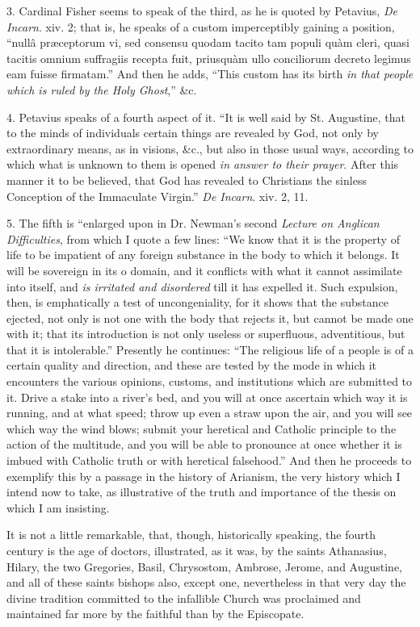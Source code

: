 3. Cardinal Fisher seems to speak of the third, as
he is quoted by Petavius, \emph{De Incarn}. xiv. 2; that is, he speaks
of a custom imperceptibly gaining a position, ``nullâ præceptorum vi,
sed consensu quodam tacito tam populi quàm cleri, quasi tacitis omnium
suffragiis recepta fuit, priusquàm ullo conciliorum decreto legimus eam
fuisse firmatam.'' And then he adds, ``This custom has its birth \emph{in
that people which is ruled by the Holy Ghost},'' \&c.

4. Petavius speaks of a fourth aspect of it. ``It is
well said by St. Augustine, that to the minds of individuals certain
things are revealed by God, not only by extraordinary means, as in
visions, \&c., but also in those usual ways, according to which what
is unknown to them is opened \emph{in answer to their prayer}. After
this manner it to be believed, that God has revealed to Christians the
sinless Conception of the Immaculate Virgin.'' \emph{De Incarn}. xiv. 2,
11.

5. The fifth is ``enlarged upon in Dr. Newman's
second \emph{Lecture on Anglican Difficulties}, from which I quote a few
lines: ``We know that it is the property of life to be impatient of any
foreign substance in the body to which it belongs. It will be sovereign
in its o domain, and it conflicts with what it cannot assimilate into
itself, and \emph{is irritated and disordered} till it has expelled it.
Such expulsion, then, is emphatically a test of uncongeniality, for it
shows that the substance ejected, not only is not one with the body that
rejects it, but cannot be made one with it; that its introduction is not
only useless or superfluous, adventitious, but that it is intolerable.''
Presently he continues: ``The religious life of a people is of a certain
quality and direction, and these are tested by the mode in which it
encounters the various opinions, customs, and institutions which are
submitted to it. Drive a stake into a river's bed, and you will at once
ascertain which way it is running, and at what speed; throw up even a
straw upon the air, and you will see which way the wind blows; submit
your heretical and Catholic principle to the action of the multitude,
and you will be able to pronounce at once whether it is imbued with
Catholic truth or with heretical falsehood.'' And then he proceeds
to exemplify this by a passage in the history of Arianism, the very
history which I intend now to take, as illustrative of the truth and
importance of the thesis on which I am insisting.

It is not a little remarkable, that, though,
historically speaking, the fourth century is the age of doctors,
illustrated, as it was, by the saints Athanasius, Hilary, the two
Gregories, Basil, Chrysostom, Ambrose, Jerome, and Augustine, and all of
these saints bishops also, except one, nevertheless in that very day the
divine tradition committed to the infallible Church was proclaimed and
maintained far more by the faithful than by the Episcopate.

